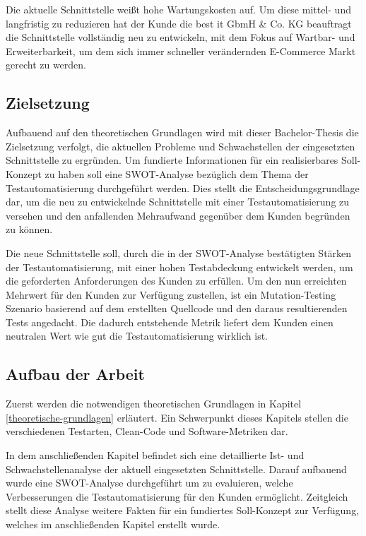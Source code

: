 Die aktuelle Schnittstelle weißt hohe Wartungskosten auf. Um diese mittel- und langfristig zu reduzieren hat der Kunde die best it GbmH \& Co. KG beauftragt die Schnittstelle vollständig neu zu entwickeln, mit dem Fokus auf Wartbar- und Erweiterbarkeit, um dem sich immer schneller verändernden E-Commerce Markt gerecht zu werden. 

\subsection{Zielsetzung}
Aufbauend auf den theoretischen Grundlagen wird mit dieser Bachelor-Thesis die Zielsetzung verfolgt, die aktuellen Probleme und Schwachstellen der eingesetzten Schnittstelle zu ergründen. Um fundierte Informationen für ein realisierbares Soll-Konzept zu haben soll eine SWOT-Analyse bezüglich dem Thema der Testautomatisierung durchgeführt werden. Dies stellt die Entscheidungsgrundlage dar, um die neu zu entwickelnde Schnittstelle mit einer Testautomatisierung zu versehen und den anfallenden Mehraufwand gegenüber dem Kunden begründen zu können. 

Die neue Schnittstelle soll, durch die in der SWOT-Analyse bestätigten Stärken der Testautomatisierung, mit einer hohen Testabdeckung entwickelt werden, um die geforderten Anforderungen des Kunden zu erfüllen. Um den nun erreichten Mehrwert für den Kunden zur Verfügung zustellen, ist ein Mutation-Testing Szenario basierend auf dem erstellten Quellcode und den daraus resultierenden Tests angedacht. Die dadurch entstehende Metrik liefert dem Kunden einen neutralen Wert wie gut die Testautomatisierung wirklich ist. 

\subsection{Aufbau der Arbeit}
Zuerst werden die notwendigen theoretischen Grundlagen in Kapitel \ref{theoretische-grundlagen} erläutert. Ein Schwerpunkt dieses Kapitels stellen die verschiedenen Testarten, Clean-Code und Software-Metriken dar.

In dem anschließenden Kapitel befindet sich eine detaillierte Ist- und Schwachstellenanalyse der aktuell eingesetzten Schnittstelle. Darauf aufbauend wurde eine SWOT-Analyse durchgeführt um zu evaluieren, welche Verbesserungen die Testautomatisierung für den Kunden ermöglicht. Zeitgleich stellt diese Analyse weitere Fakten für ein fundiertes Soll-Konzept zur Verfügung, welches im anschließenden Kapitel erstellt wurde.

